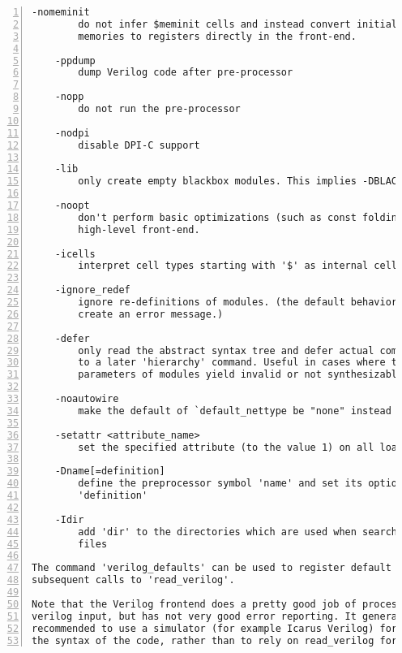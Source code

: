 \begin{lstlisting}[numbers=left,frame=single]
    -nomeminit
        do not infer $meminit cells and instead convert initialized
        memories to registers directly in the front-end.

    -ppdump
        dump Verilog code after pre-processor

    -nopp
        do not run the pre-processor

    -nodpi
        disable DPI-C support

    -lib
        only create empty blackbox modules. This implies -DBLACKBOX.

    -noopt
        don't perform basic optimizations (such as const folding) in the
        high-level front-end.

    -icells
        interpret cell types starting with '$' as internal cell types

    -ignore_redef
        ignore re-definitions of modules. (the default behavior is to
        create an error message.)

    -defer
        only read the abstract syntax tree and defer actual compilation
        to a later 'hierarchy' command. Useful in cases where the default
        parameters of modules yield invalid or not synthesizable code.

    -noautowire
        make the default of `default_nettype be "none" instead of "wire".

    -setattr <attribute_name>
        set the specified attribute (to the value 1) on all loaded modules

    -Dname[=definition]
        define the preprocessor symbol 'name' and set its optional value
        'definition'

    -Idir
        add 'dir' to the directories which are used when searching include
        files

The command 'verilog_defaults' can be used to register default options for
subsequent calls to 'read_verilog'.

Note that the Verilog frontend does a pretty good job of processing valid
verilog input, but has not very good error reporting. It generally is
recommended to use a simulator (for example Icarus Verilog) for checking
the syntax of the code, rather than to rely on read_verilog for that.
\end{lstlisting}


